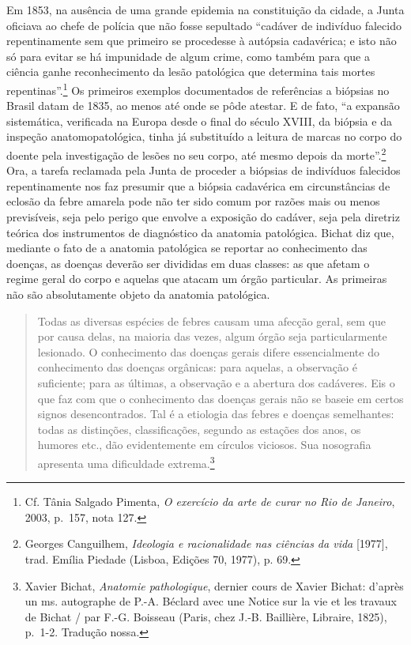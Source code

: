 Em 1853, na ausência de uma grande epidemia na constituição da cidade, a
Junta oficiava ao chefe de polícia que não fosse sepultado ``cadáver de
indivíduo falecido repentinamente sem que primeiro se procedesse à
autópsia cadavérica; e isto não só para evitar se há impunidade de algum
crime, como também para que a ciência ganhe reconhecimento da lesão
patológica que determina tais mortes repentinas''.\footnote{Cf. Tânia
  Salgado Pimenta, \textit{O exercício da arte de curar no Rio de
  Janeiro}, 2003, p.~157, nota 127.} Os primeiros exemplos documentados
de referências a biópsias no Brasil datam de 1835, ao menos até onde se
pôde atestar. E de fato, ``a expansão sistemática, verificada na Europa
desde o final do século XVIII, da biópsia e da inspeção
anatomopatológica, tinha já substituído a leitura de marcas no corpo do
doente pela investigação de lesões no seu corpo, até mesmo depois da
morte''.\footnote{Georges Canguilhem, \textit{Ideologia e racionalidade
  nas ciências da vida} {[}1977{]}, trad. Emília Piedade (Lisboa,
  Edições 70, 1977), p. 69.} Ora, a tarefa reclamada pela Junta de
proceder a biópsias de indivíduos falecidos repentinamente nos faz
presumir que a biópsia cadavérica em circunstâncias de eclosão da febre
amarela pode não ter sido comum por razões mais ou menos previsíveis,
seja pelo perigo que envolve a exposição do cadáver, seja pela diretriz
teórica dos instrumentos de diagnóstico da anatomia patológica. Bichat
diz que, mediante o fato de a anatomia patológica se reportar ao
conhecimento das doenças, as doenças deverão ser divididas em duas
classes: as que afetam o regime geral do corpo e aquelas que atacam um
órgão particular. As primeiras não são absolutamente objeto da anatomia
patológica.

\begin{quote}
Todas as diversas espécies de febres causam uma afecção geral, sem que
por causa delas, na maioria das vezes, algum órgão seja particularmente
lesionado. O conhecimento das doenças gerais difere essencialmente do
conhecimento das doenças orgânicas: para aquelas, a observação é
suficiente; para as últimas, a observação e a abertura dos cadáveres.
Eis o que faz com que o conhecimento das doenças gerais não se baseie em
certos signos desencontrados. Tal é a etiologia das febres e doenças
semelhantes: todas as distinções, classificações, segundo as estações
dos anos, os humores etc., dão evidentemente em círculos viciosos. Sua
nosografia apresenta uma dificuldade extrema.\footnote{Xavier Bichat,
  \textit{Anatomie pathologique}, dernier cours de Xavier Bichat: d'après
  un ms. autographe de P.-A. Béclard avec une Notice sur la vie et les
  travaux de Bichat / par F.-G. Boisseau (Paris, chez J.-B. Baillière,
  Libraire, 1825), p.~1-2. Tradução nossa.}
\end{quote}


